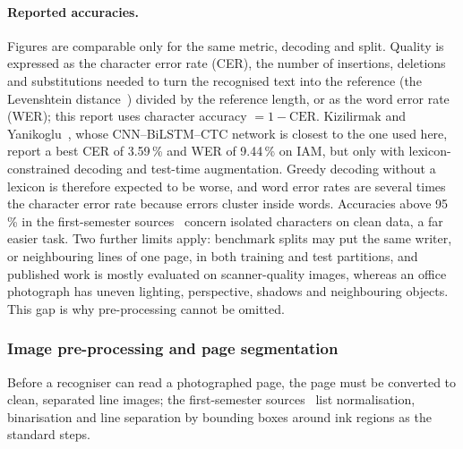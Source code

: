 \paragraph{Reported accuracies.}\label{sec:lit-acc} Figures are comparable only for the same metric, decoding and split. Quality is expressed as the character error rate (CER), the number of insertions, deletions and substitutions needed to turn the recognised text into the reference (the Levenshtein distance~\cite{levenshtein1966}) divided by the reference length, or as the word error rate (WER); this report uses character accuracy $=1-\text{CER}$. Kizilirmak and Yanikoglu~\cite{kizilirmak2023}, whose CNN--BiLSTM--CTC network is closest to the one used here, report a best CER of 3.59\,\% and WER of 9.44\,\% on IAM, but only with lexicon-constrained decoding and test-time augmentation. Greedy decoding without a lexicon is therefore expected to be worse, and word error rates are several times the character error rate because errors cluster inside words. Accuracies above 95\,\% in the first-semester sources~\cite{yahya2021,ji2021,chen2023} concern isolated characters on clean data, a far easier task. Two further limits apply: benchmark splits may put the same writer, or neighbouring lines of one page, in both training and test partitions, and published work is mostly evaluated on scanner-quality images, whereas an office photograph has uneven lighting, perspective, shadows and neighbouring objects. This gap is why pre-processing cannot be omitted.

\subsubsection{Image pre-processing and page segmentation}
\label{sec:lit-prep}

Before a recogniser can read a photographed page, the page must be converted to clean, separated line images; the first-semester sources~\cite{chen2023,hemanth2022} list normalisation, binarisation and line separation by bounding boxes around ink regions as the standard steps.

